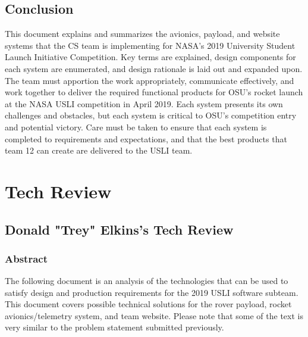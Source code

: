 \documentclass[onecolumn, draftclsnofoot, 10pt, compsoc]{IEEEtran}
\begin{document}
\subsection{Conclusion}
This document explains and summarizes the avionics, payload, and website systems that the CS team is implementing for NASA's 2019 University Student Launch Initiative Competition. Key terms are explained, design components for each system are enumerated, and design rationale is laid out and expanded upon. The team must apportion the work appropriately, communicate effectively, and work together to deliver the required functional products for OSU's rocket launch at the NASA USLI competition in April 2019. Each system presents its own challenges and obstacles, but each system is critical to OSU's competition entry and potential victory. Care must be taken to ensure that each system is completed to requirements and expectations, and that the best products that team 12 can create are delivered to the USLI team.

\section{Tech Review}
\subsection{Donald "Trey" Elkins's Tech Review}
\subsubsection{Abstract}
The following document is an analysis of the technologies that can be used to satisfy design and production requirements for the 2019 USLI software subteam. This document covers possible technical solutions for the rover payload, rocket avionics/telemetry system, and team website. Please note that some of the text is very similar to the problem statement submitted previously.
\end{document}
